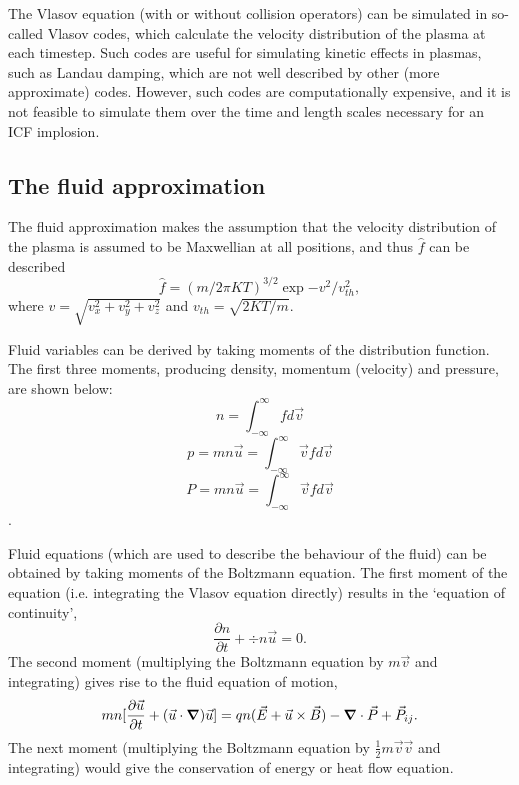 The Vlasov equation (with or without collision operators) can be simulated in so-called Vlasov codes, which calculate the velocity distribution of the plasma at each timestep. Such codes are useful for simulating kinetic effects in plasmas, such as Landau damping, which are not well described by other (more approximate) codes. However, such codes are computationally expensive, and it is not feasible to simulate them over the time and length scales necessary for an ICF implosion.

\subsection{The fluid approximation}

The fluid approximation makes the assumption that the velocity distribution of the plasma is assumed to be Maxwellian at all positions, and thus $\hat{f}$ can be described 
\begin{equation} \hat{f} = (m / 2\pi KT)^{3/2} \exp{-v^2/v_{th}^2}, \end{equation} where $v = \sqrt{v_x^2 + v_y^2 + v_z^2}$ and $v_{th} = \sqrt{2KT/m}$.

Fluid variables can be derived by taking moments of the distribution function. The first three moments, producing density, momentum (velocity) and pressure, are shown below:
\begin{equation} n = \int^{\infty}_{-\infty} f d\vec{v} \end{equation}
\begin{equation} p = mn\vec{u} = \int^{\infty}_{-\infty} \vec{v} f d\vec{v} \end{equation}
\begin{equation} P = mn\vec{u} = \int^{\infty}_{-\infty} \vec{v} f d\vec{v} \end{equation}.

Fluid equations (which are used to describe the behaviour of the fluid) can be obtained by taking moments of the Boltzmann equation. The first moment of the equation (i.e. integrating the Vlasov equation directly) results in the `equation of continuity', \begin{equation} \frac{\partial n}{\partial t} + \div{n \vec{u}} = 0. \end{equation} The second moment (multiplying the Boltzmann equation by $m\vec{v}$ and integrating) gives rise to the fluid equation of motion,
\begin{equation} mn[\frac{\partial \vec{u}}{\partial t} + (\vec{u} \cdot \grad)\vec{u}] = qn(\vec{E} + \vec{u} \times \vec{B}) - \grad \cdot \vec{P} + \vec{P}_{ij}. \end{equation} The next moment (multiplying the Boltzmann equation by $\frac{1}{2} m \vec{v}\vec{v}$ and integrating) would give the conservation of energy or heat flow equation.

